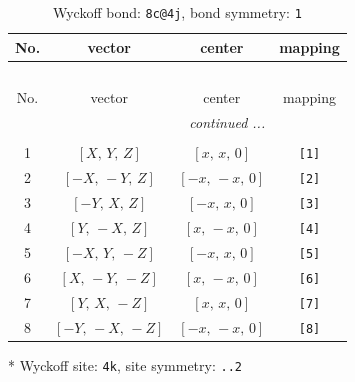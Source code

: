 \documentclass[fleqn,8pt]{jsarticle}
\begin{document}
\renewcommand{\arraystretch}{1.2}
\begin{longtable}{cccc}
\caption{Wyckoff bond: {\tt 8c@4j}, bond symmetry: {\tt 1}}
 \\
 \hline \hline
No. & vector & center & mapping \\ \hline \endfirsthead

\multicolumn{3}{l}{\tablename\ \thetable{}} \\
 \hline \hline
No. & vector & center & mapping \\ \hline \endhead

 \hline \hline
\multicolumn{3}{r}{\footnotesize\it continued ...} \\ \endfoot

 \hline \hline
\multicolumn{3}{r}{} \\ \endlastfoot

1 & $\left[ X,\, Y,\, Z \right]$ & $\left[ x,\, x,\, 0 \right]$ & {\tt [1]} \\ \hline
2 & $\left[ - X,\, - Y,\, Z \right]$ & $\left[ - x,\, - x,\, 0 \right]$ & {\tt [2]} \\ \hline
3 & $\left[ - Y,\, X,\, Z \right]$ & $\left[ - x,\, x,\, 0 \right]$ & {\tt [3]} \\ \hline
4 & $\left[ Y,\, - X,\, Z \right]$ & $\left[ x,\, - x,\, 0 \right]$ & {\tt [4]} \\ \hline
5 & $\left[ - X,\, Y,\, - Z \right]$ & $\left[ - x,\, x,\, 0 \right]$ & {\tt [5]} \\ \hline
6 & $\left[ X,\, - Y,\, - Z \right]$ & $\left[ x,\, - x,\, 0 \right]$ & {\tt [6]} \\ \hline
7 & $\left[ Y,\, X,\, - Z \right]$ & $\left[ x,\, x,\, 0 \right]$ & {\tt [7]} \\ \hline
8 & $\left[ - Y,\, - X,\, - Z \right]$ & $\left[ - x,\, - x,\, 0 \right]$ & {\tt [8]} \\
\end{longtable}
* Wyckoff site: {\tt 4k}, site symmetry: {\tt ..2}
\renewcommand{\arraystretch}{1.2}
\end{document}
